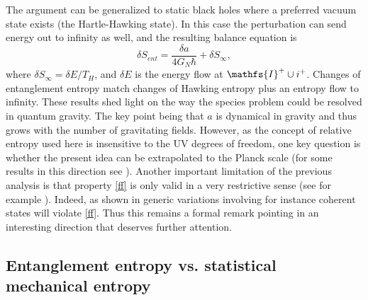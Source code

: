 \documentclass[aps, nofootinbib,superscriptaddress,12pt]{revtex4-2}
\def\be{\begin{equation}}
\def\ee{\end{equation}}
\newcommand{\mfs}[1]{\mathfs {#1}}                               %
\newcommand{\sI}{{\mfs I}}
\begin{document}
The argument can be generalized to static black holes \cite{Perez:2014ura} where a preferred vacuum state exists (the Hartle-Hawking state). In this case the perturbation can send energy out to infinity as well, and the resulting balance equation is \be\label{dent}
\delta S_{ent}={\frac{ \delta a}{4G_N\hbar}}+\delta S_{\infty},
\ee
where $\delta S_{\infty}=\delta E/T_{H}$, and $\delta E$ is the energy flow at $\sI^+\cup i^+$.
Changes of entanglement entropy match changes of Hawking entropy plus an entropy flow to infinity.
These results shed light on the way the species problem could be resolved in quantum gravity. The key point being that $a$ is dynamical in gravity and thus grows with the number of gravitating fields. However,  as the concept of relative entropy used here is insensitive to the UV degrees of freedom,
one key question  is whether the present idea can be extrapolated to the Planck scale (for some results in this direction see \cite{Bianchi:2012vp, Chirco:2014saa, Chirco:2014naa}). Another important limitation of the previous analysis is that property \eqref{ff} is only valid in a very restrictive sense (see for example \cite{Blanco:2013joa}). Indeed, as shown in \cite{Varadarajan:2016kei} generic variations involving for instance coherent states will violate \eqref{ff}. Thus this remains a formal remark pointing in an interesting direction that deserves further attention. 


\subsection{Entanglement entropy vs. statistical mechanical entropy}\label{sf}
\end{document}
